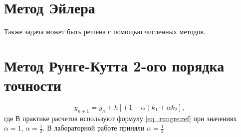     \section{Метод Эйлера}
    Также задача может быть решена с помощью численных методов. 
    
    
    \section{Метод Рунге-Кутта 2-ого порядка точности}
    \begin{equation}
    	y_{n+1} = y_n + h[(1 - \alpha) k_1 + \alpha k_2],
    	\label{eq_rungre:ref}
    \end{equation}
    где  
    В практике расчетов используют формулу \eqref{eq_rungre:ref} при значениях $\alpha = 1$, $\alpha = \frac{1}{2}$. В лабораторной работе приняли $\alpha = \frac{1}{2}$

   \newpage